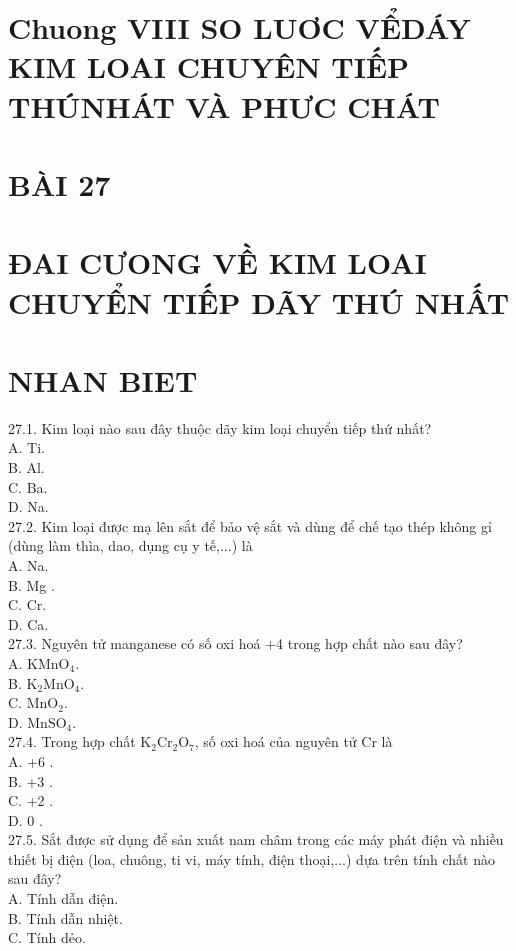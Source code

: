 \documentclass[10pt]{article}
\begin{document}
\section*{Chuong VIII SO LUƠC VỂDÁY KIM LOAI CHUYÊN TIẾP THÚNHÁT VÀ PHƯC CHÁT}
\section*{BÀI 27}
\section*{ĐAI CƯONG VỀ KIM LOAI CHUYỂN TIẾP DÃY THÚ NHẤT}
\section*{NHAN BIET}
27.1. Kim loại nào sau đây thuộc dãy kim loại chuyển tiếp thứ nhất?\\
A. Ti.\\
B. Al.\\
C. Ba.\\
D. Na.\\
27.2. Kim loại được mạ lên sắt để bảo vệ sắt và dùng để chế tạo thép không gỉ (dùng làm thìa, dao, dụng cụ y tế,...) là\\
A. Na.\\
B. Mg .\\
C. Cr.\\
D. Ca.\\
27.3. Nguyên tử manganese có số oxi hoá +4 trong hợp chất nào sau đây?\\
A. $\mathrm{KMnO}_{4}$.\\
B. $\mathrm{K}_{2} \mathrm{MnO}_{4}$.\\
C. $\mathrm{MnO}_{2}$.\\
D. $\mathrm{MnSO}_{4}$.\\
27.4. Trong hợp chất $\mathrm{K}_{2} \mathrm{Cr}_{2} \mathrm{O}_{7}$, số oxi hoá của nguyên tử Cr là\\
A. +6 .\\
B. +3 .\\
C. +2 .\\
D. 0 .\\
27.5. Sắt được sử dụng để sản xuất nam châm trong các máy phát điện và nhiều thiết bị điện (loa, chuông, ti vi, máy tính, điện thoại,...) dựa trên tính chất nào sau đây?\\
A. Tính dẫn điện.\\
B. Tính dẫn nhiệt.\\
C. Tính dẻo.\\
\end{document}
